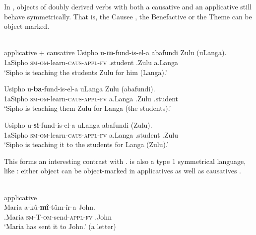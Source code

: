 \documentclass[output=paper]{LSP/langsci}
\begin{document}
In , objects of doubly derived verbs with both a causative and an applicative still behave symmetrically. That is, the Causee , the Benefactive  or the Theme  can be object marked.


\ea\label{ex:vanderwal:39}%
 \citep{Zeller2011}\\
 {applicative + causative}
 \ea\label{ex:vanderwal:39a}
\gll Usipho  u-\textbf{m}{}-fund-is-el-a  abafundi  {Zulu}  (uLanga). \\
    1aSipho  \textsc{sm}{}-\textsc{om}{}-learn-\textsc{caus}{}-\textsc{appl}{}-\textsc{fv}  .student  .{Zulu}  a.Langa\\
    \glt ‘Sipho is teaching the students {Zulu} for him (Langa).’

 \ex\label{ex:vanderwal:39b}
\gll Usipho  u-\textbf{ba}{}-fund-is-el-a  uLanga  {Zulu}   (abafundi). \\
    1aSipho  \textsc{sm}{}-\textsc{om}{}-learn-\textsc{caus}{}-\textsc{appl}{}-\textsc{fv}   a.Langa  .{Zulu}  .student \\
    \glt ‘Sipho is teaching them {Zulu} for Langa (the students).’

 \ex\label{ex:vanderwal:39c}
\gll Usipho  u-\textbf{si}{}-fund-is-el-a  uLanga  abafundi  ({Zulu}).\\
    1aSipho  \textsc{sm}{}-\textsc{om}{}-learn-\textsc{caus}{}-\textsc{appl}{}-\textsc{fv}   a.Langa  .student  .{Zulu} \\

    \glt ‘Sipho is teaching it to the students for Langa ({Zulu}).’
\z
\z


This forms an interesting contrast with .  is also a type 1 symmetrical language, like : either object can be object-marked in applicatives  as well as causatives .

\noindent {} \citep[83, 84]{Muriungi2008}\\
\ea\label{ex:vanderwal:40}%
 {applicative}\\
 \ea\label{ex:vanderwal:40a}
\gll Maria  a-kû-\textbf{mî}{}-tûm-îr-a  John.\\
    .Maria  \textsc{sm-T-om}{}-send-\textsc{appl}{}-\textsc{fv}  .John \\
    \glt ‘Maria has sent it to John.’ (a letter)
\end{document}
